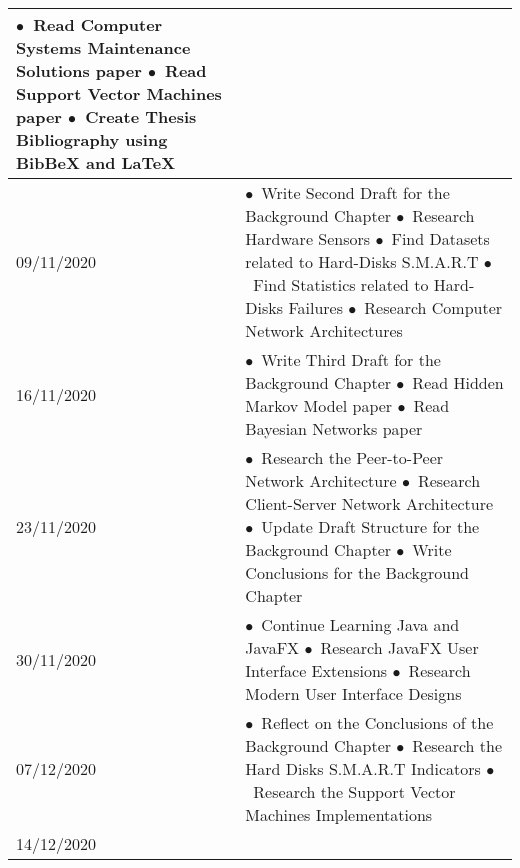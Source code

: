 \begin{longtable}{
|p{}%
|p{}|%
}
    \indent$\bullet$\ Read Computer Systems Maintenance Solutions paper \newline
    \indent$\bullet$\ Read Support Vector Machines paper \newline
    \indent$\bullet$\ Create Thesis Bibliography using BibBeX and LaTeX
    \\ \hline
    09/11/2020                 &
    \indent$\bullet$\ Write Second Draft for the Background Chapter \newline
    \indent$\bullet$\ Research Hardware Sensors \newline
    \indent$\bullet$\ Find Datasets related to Hard-Disks S.M.A.R.T \newline
    \indent$\bullet$\ Find Statistics related to Hard-Disks Failures \newline
    \indent$\bullet$\ Research Computer Network Architectures
    \\ \hline
    16/11/2020                 &
    \indent$\bullet$\ Write Third Draft for the Background Chapter \newline
    \indent$\bullet$\ Read Hidden Markov Model paper \newline
    \indent$\bullet$\ Read Bayesian Networks paper
    \\ \hline
    23/11/2020                 &
    \indent$\bullet$\ Research the Peer-to-Peer Network Architecture \newline
    \indent$\bullet$\ Research Client-Server Network Architecture \newline
    \indent$\bullet$\ Update Draft Structure for the Background Chapter \newline
    \indent$\bullet$\ Write Conclusions for the Background Chapter
    \\ \hline
    30/11/2020                 &
    \indent$\bullet$\ Continue Learning Java and JavaFX \newline
    \indent$\bullet$\ Research JavaFX User Interface Extensions \newline
    \indent$\bullet$\ Research Modern User Interface Designs
    \\ \hline
    07/12/2020                 &
    \indent$\bullet$\ Reflect on the Conclusions of the Background Chapter \newline
    \indent$\bullet$\ Research the Hard Disks S.M.A.R.T Indicators \newline
    \indent$\bullet$\ Research the Support Vector Machines Implementations
    \\ \hline
    14/12/2020                 &

\end{longtable}
